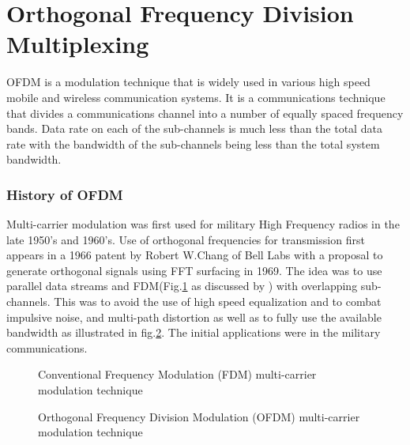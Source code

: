 

\section{Orthogonal Frequency Division Multiplexing}
\gls{OFDM} is a modulation technique that is widely used in various high speed mobile and wireless communication systems. It is a communications technique that divides a communications channel into a number of equally spaced frequency bands. Data rate on each of the sub-channels is much less than the total data rate with the bandwidth of the sub-channels being less than the total system bandwidth. 


\subsubsection*{History of OFDM}
Multi-carrier modulation was first used for military High Frequency radios in the late 1950's and 1960's. Use of orthogonal frequencies for transmission first appears in a 1966 patent by Robert W.Chang of Bell Labs with a proposal to generate orthogonal signals using \gls{FFT} surfacing in 1969. The idea was to use parallel data streams and \gls{FDM}(Fig.\ref{Conv_fdm} as discussed by \cite{ofdm_intro}) with overlapping sub-channels. This was to avoid the use of high speed equalization and to combat impulsive noise, and multi-path distortion as well as to fully use the available bandwidth as illustrated in fig.\ref{Conv_ofdm}\cite{ofdm_intro}. The initial applications were in the military communications.

\begin{figure}[h!]
	\centerline{\resizebox{16cm}{!}{}}
	
	\caption{Conventional Frequency Modulation (FDM) multi-carrier modulation technique}
	\label{Conv_fdm}
\end{figure}

\begin{figure}[h!]
	\centerline{\resizebox{16cm}{!}{}}
	
	\caption{Orthogonal Frequency Division Modulation (OFDM) multi-carrier modulation technique}
	\label{Conv_ofdm}
\end{figure}

